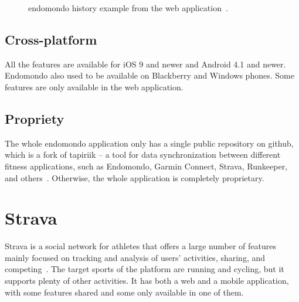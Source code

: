 \begin{figure}[htb!]
    \centering
        \caption{endomondo history example from the web application~\cite{endomondo-history-img}.}
\end{figure}

\subsection*{Cross-platform}
All the features are available for iOS 9 and newer and Android 4.1 and newer.
Endomondo also used to be available on Blackberry and Windows phones.
Some features are only available in the web application.
\subsection*{Propriety}
The whole endomondo application only has a single public repository on github, which is a fork of tapiriik -- a tool for data synchronization between different fitness applications, such as Endomondo, Garmin Connect, Strava, Runkeeper, and others~\cite{endomondo-tapiriik}.
Otherwise, the whole application is completely proprietary.
\pagebreak
\pagebreak
\section{Strava}
Strava is a social network for athletes that offers a large number of features mainly focused on tracking and analysis of users' activities, sharing, and competing~\cite{strava}.
The target sports of the platform are running and cycling, but it supports plenty of other activities.
It has both a web and a mobile application, with some features shared and some only available in one of them.

